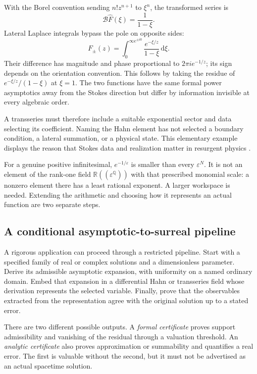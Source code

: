 \documentclass[11pt,a4paper]{article}
\numberwithin{equation}{section}
\theoremstyle{definition}
\theoremstyle{remark}
\newcommand{\R}{\mathbb R}
\newcommand{\Q}{\mathbb Q}
\newcommand{\eps}{\varepsilon}
\newcommand{\dd}{\mathrm d}
\begin{document}
With the Borel convention sending $n!z^{n+1}$ to $\xi^n$, the transformed series is
\begin{equation}
 \mathcal B\widehat F(\xi)=\frac1{1-\xi}.
\end{equation}
Lateral Laplace integrals bypass the pole on opposite sides:
\begin{equation}
 F_\pm(z)=\int_{0}^{\infty e^{\pm i0}}
 \frac{e^{-\xi/z}}{1-\xi}\,\dd\xi.
\end{equation}
Their difference has magnitude and phase proportional to $2\pi i e^{-1/z}$; its sign depends on the orientation convention. This follows by taking the residue of $e^{-\xi/z}/(1-\xi)$ at $\xi=1$. The two functions have the same formal power asymptotics away from the Stokes direction but differ by information invisible at every algebraic order.

A transseries must therefore include a suitable exponential sector and data selecting its coefficient. Naming the Hahn element has not selected a boundary condition, a lateral summation, or a physical state. This elementary example displays the reason that Stokes data and realization matter in resurgent physics \cite{Resurgence}.

For a genuine positive infinitesimal, $e^{-1/\eps}$ is smaller than every $\eps^N$. It is not an element of the rank-one field $\R((\eps^\Q))$ with that prescribed monomial scale: a nonzero element there has a least rational exponent. A larger workspace is needed. Extending the arithmetic and choosing how it represents an actual function are two separate steps.

\subsection{A conditional asymptotic-to-surreal pipeline}
A rigorous application can proceed through a restricted pipeline. Start with a specified family of real or complex solutions and a dimensionless parameter. Derive its admissible asymptotic expansion, with uniformity on a named ordinary domain. Embed that expansion in a differential Hahn or transseries field whose derivation represents the selected variable. Finally, prove that the observables extracted from the representation agree with the original solution up to a stated error.

There are two different possible outputs. A \emph{formal certificate} proves support admissibility and vanishing of the residual through a valuation threshold. An \emph{analytic certificate} also proves approximation or summability and quantifies a real error. The first is valuable without the second, but it must not be advertised as an actual spacetime solution.
\end{document}
